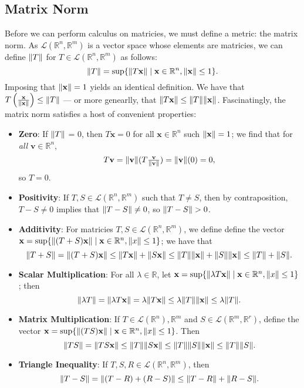 \documentclass[11pt]{article}
\renewcommand{\vec}[1]{\mathbf{#1}}
\begin{document}
\subsection{Matrix Norm}
Before we can perform calculus on matricies, we must define a metric: the matrix norm. As $\mathcal{L}(\mathbb{R}^{n}, \mathbb{R}^{m})$ is a vector space whose elements are matricies, we can define $\norm{T}$ for $T \in \mathcal{L}(\mathbb{R}^{n}, \mathbb{R}^{m})$ as follows:
\[
	\norm{T} = \sup \{ \norm{T \vec{x}} \mid \vec{x} \in \mathbb{R}^{n}, \norm{\vec{x}} \le 1\}.
\]
Imposing that $\norm{\vec{x}} = 1$ yields an identical definition. We have that $T \left( \tfrac{\vec{x}}{\norm{\vec{x}}} \right) \le \norm{T}$ --- or more genearlly, that $\norm{T \vec{x}} \le \norm{T} \norm{\vec{x}}$. Fascinatingly, the matrix norm satisfies a host of convenient properties:
\begin{itemize}
	\item \textbf{Zero}: If $\norm{T}$ = 0, then $T \vec{x} = 0$ for all $\vec{x} \in \mathbb{R}^{n}$ such $\norm{\vec{x}} = 1$; we find that for \textit{all} $\vec{v} \in \mathbb{R}^{n}$,
	\[
		T \vec{v} = \norm{\vec{v}} (T \tfrac{\vec{\vec{v}}}{\norm{\vec{v}}}) = \norm{\vec{v}} (0) = 0,
	\]
	so $T = 0$.
	\item \textbf{Positivity}: If $T, S \in \mathcal{L}(\mathbb{R}^{n}, \mathbb{R}^{m})$ such that $T \ne S$, then by contraposition, $T - S \ne 0$ implies that $\norm{T - S} \ne 0$, so $\norm{T - S} > 0$.
	\item \textbf{Additivity}: For matricies $T, S \in \mathcal{L} (\mathbb{R}^{n}, \mathbb{R}^{m})$, we define define the vector $\vec{x} = \sup \{ \norm{(T + S)\vec{x}} \mid \vec{x} \in \mathbb{R}^{n}, \norm{x} \le 1 \}$; we have that 
	\[
		\norm{T + S} = \norm{(T + S) \vec{x}} \le \norm{T \vec{x}} + \norm{S \vec{x}} \le \norm{T} \norm{\vec{x}} + \norm{S} \norm{\vec{x}} \le \norm{T} + \norm{S}.
	\]
	\item \textbf{Scalar Multiplication}: For all $\lambda \in \mathbb{R}$, let $\vec{x} = \sup \{ \norm{\lambda T \vec{x}} \mid \vec{x} \in \mathbb{R}^{n}, \norm{x} \le 1 \}$; then
	\[
		\norm{\lambda T} = \norm{\lambda T \vec{x}} = \lambda \norm{T \vec{x}} \le \lambda \norm{T} \norm{\vec{x}} \le \lambda \norm{T}.
	\]
	\item \textbf{Matrix Multiplication}: If $T \in \mathcal{L}(\mathbb{R}^{n}), \mathbb{R}^{m}$ and $S \in \mathcal{L}(\mathbb{R}^{m}, \mathbb{R}^{r})$, define the vector $\vec{x} = \sup \{ \norm{(TS) \vec{x}} \mid \vec{x} \in \mathbb{R}^{n}, \norm{x} \le 1 \}$. Then
	\[
		\norm{TS} = \norm{TS \vec{x}} \le \norm{T} \norm{S \vec{x}} \le \norm{T} \norm{S} \norm{\vec{x}} \le \norm{T} \norm{S}.
	\]
	\item \textbf{Triangle Inequality}: If $T, S, R \in \mathcal{L}(\mathbb{R}^{n}, \mathbb{R}^{m})$, then
	\[
		\norm{T - S} = \norm{(T - R) + (R - S)} \le \norm{T - R} + \norm{R - S}.
	\]
\end{itemize}
\end{document}
